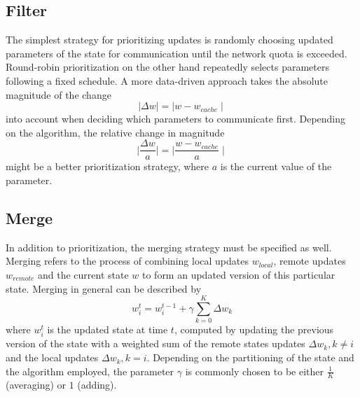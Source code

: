\subsection{Filter}
\label{ss:filtering_strategies}
The simplest strategy for prioritizing updates is randomly choosing updated parameters of the state for communication until the network quota is exceeded.
Round-robin prioritization on the other hand repeatedly selects parameters following a fixed schedule.
A more data-driven approach takes the absolute magnitude of the change
\begin{equation}
\mid\Delta w\mid = \mid w - w_{cache} \mid
\label{eqn:absolute_magnitude}
\end{equation}
into account when deciding which parameters to communicate first.
Depending on the algorithm, the relative change in magnitude
\begin{equation}
\mid\frac{\Delta w}{a} \mid = \mid\frac{w - w_{cache}}{a} \mid
\label{eqn:relative_magnitude}
\end{equation}
might be a better prioritization strategy, where $a$ is the current value of the parameter.

\subsection{Merge}
\label{ss:merging_strategies}
In addition to prioritization, the merging strategy must be specified as well.
Merging refers to the process of combining local updates $w_{local}$, remote updates $w_{remote}$ and the current state $w$ to form an updated version of this particular state.
Merging in general can be described by
\begin{equation}
w_{i}^{t} = w_{i}^{t-1} + \gamma\sum_{k = 0}^{K}\Delta w_{k}
\label{eqn:state_merging}
\end{equation}
where $w_i^t$ is the updated state at time $t$, computed by updating the previous version of the state with a weighted sum of the remote states updates $\Delta w_k, k \neq i$ and the local updates $\Delta w_k, k = i$.
Depending on the partitioning of the state and the algorithm employed, the parameter $\gamma$ is commonly chosen to be either $\frac{1}{K}$ (averaging) or $1$ (adding).
